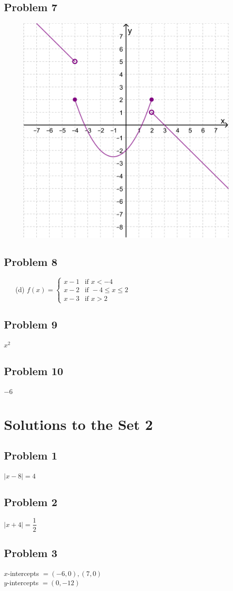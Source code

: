 \documentclass[12pt]{article}
\begin{document}
\subsection*{Problem 7}
\begin{figure}[!ht]
    \centering
    \includegraphics[width=0.5\linewidth]{3.png}
\end{figure}
\subsection*{Problem 8}
\begin{enumerate}
    \item[(d)] $f(x) = \begin{cases} 
          x - 1 & \text{if } x < -4 \\ 
          x - 2 & \text{if } -4 \leq x \leq 2 \\ 
          x - 3 & \text{if } x > 2 
          \end{cases}$ 
\end{enumerate}
\subsection*{Problem 9}
\(x^2\)
\subsection*{Problem 10}
\(-6\)
\section*{Solutions to the Set 2}
\subsection*{Problem 1}
\(|x-8|=4\)
\subsection*{Problem 2}
\(|x+4|=\dfrac{1}{2}\)
\subsection*{Problem 3}
\(x\)-intercepts \(= (-6,0),(7,0)\)\\
\(y\)-intercepts \(=(0,-12)\)
\end{document}
